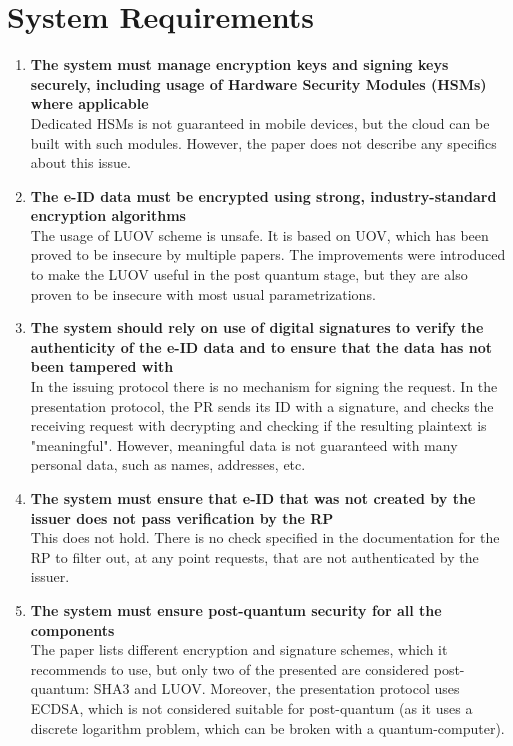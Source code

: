 \documentclass{article}
\begin{document}
	\homeworktitle
	\section{System Requirements}
	\begin{enumerate}
		\item\textbf{The system must manage encryption keys and signing keys securely, including usage of Hardware Security Modules (HSMs) where applicable}\\
		Dedicated HSMs is not guaranteed in mobile devices, but the cloud can be built with such modules. However, the paper does not describe any specifics about this issue.
		
		\item\textbf{The e-ID data must be encrypted using strong, industry-standard encryption algorithms}\\
		The usage of LUOV scheme is unsafe. It is based on UOV, which has been proved to be insecure by multiple papers. \cite{cryptoeprint:2004/222} \cite{cryptoeprint:2009/483} The improvements were introduced to make the LUOV useful in the post quantum stage, but they are also proven to be insecure with most usual parametrizations. \cite{ding2019new}
		
		\item\textbf{The system should rely on use of digital signatures to verify the authenticity of the e-ID data and to ensure that the data has not been tampered with}\\
		In the issuing protocol there is no mechanism for signing the request. In the presentation protocol, the PR sends its ID with a signature, and checks the receiving request with decrypting and checking if the resulting plaintext is "meaningful". However, meaningful data is not guaranteed with many personal data, such as names, addresses, etc.
		
		\item\textbf{The system must ensure that e-ID that was not created by the issuer does not pass verification by the RP}\\
		This does not hold. There is no check specified in the documentation for the RP to filter out, at any point requests, that are not authenticated by the issuer.
		
		\item\textbf{The system must ensure post-quantum security for all the components }\\
		The paper lists different encryption and signature schemes, which it recommends to use, but only two of the presented are considered post-quantum: SHA3 and LUOV. Moreover, the presentation protocol uses ECDSA, which is not considered suitable for post-quantum (as it uses a discrete logarithm problem, which can be broken with a quantum-computer).
		

\end{enumerate}
\end{document}
